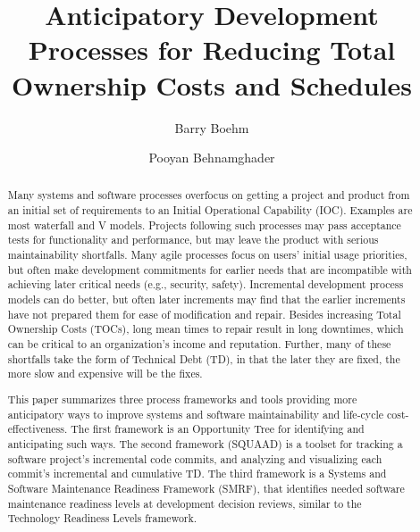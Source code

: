 \documentclass[alpha-refs]{wiley-article}
\title{Anticipatory Development Processes for Reducing Total Ownership Costs and Schedules}
\author[1]{Barry Boehm}
\author[1]{Pooyan Behnamghader}
\affil[1]{Computer Science Deparment, University of Southern California, Los Angeles, California, 90007, USA}
\begin{document}
\maketitle

\begin{abstract}
Many systems and software processes overfocus on getting a project and product from an initial set of requirements to an Initial Operational Capability (IOC).
Examples are most waterfall and V models.  Projects following such processes may pass acceptance tests for functionality and performance, but may leave the product with serious maintainability shortfalls.  Many agile processes focus on users' initial usage priorities, but often make development commitments for earlier needs that are incompatible with achieving later critical needs (e.g., security, safety).  Incremental development process models can do better, but often later increments may find that the earlier increments have not prepared them for ease of modification and repair.  Besides increasing Total Ownership Costs (TOCs), long mean times to repair result in long downtimes, which can be critical to an organization's income and reputation.  Further, many of these shortfalls take the form of Technical Debt (TD), in that the later they are fixed, the more
slow and 
expensive will be the fixes. 

This paper summarizes three process frameworks and tools providing more anticipatory ways to improve systems and software maintainability and life-cycle cost-effectiveness.  The first framework is an Opportunity Tree for identifying and anticipating such ways. 
The second framework (SQUAAD) is a toolset for tracking a software project's incremental code commits, and analyzing and visualizing each commit's incremental and cumulative TD.
The third framework is a Systems and Software Maintenance Readiness Framework (SMRF), that identifies needed software maintenance readiness levels at development decision reviews, similar to the Technology Readiness Levels framework.


\end{abstract}
\end{document}
